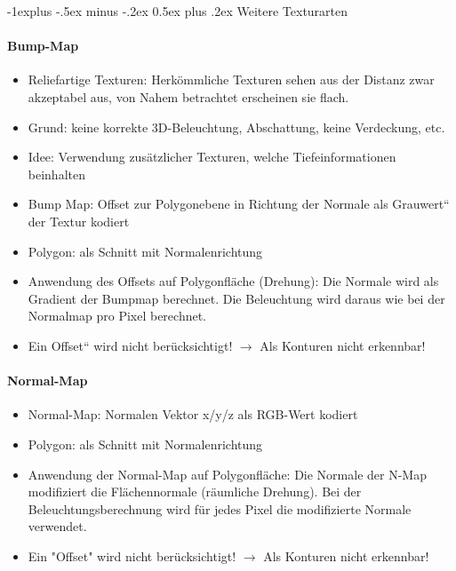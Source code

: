 \documentclass[10pt,landscape]{article}
\makeatletter
\renewcommand{\subsection}{\@startsection{subsection}{2}{0mm}%
                                {-1explus -.5ex minus -.2ex}%
                                {0.5ex plus .2ex}%
                                {\normalfont\normalsize\bfseries}}
\makeatother
\begin{document}
\begin{multicols}{3}
\subsection{ Weitere Texturarten}
\paragraph{Bump-Map}
\begin{itemize}
  \item Reliefartige Texturen: Herkömmliche Texturen sehen aus der Distanz zwar akzeptabel aus, von Nahem betrachtet erscheinen sie flach.
  \item Grund: keine korrekte 3D-Beleuchtung, Abschattung, keine Verdeckung, etc.
  \item Idee: Verwendung zusätzlicher Texturen, welche Tiefeinformationen beinhalten
\end{itemize}
\begin{itemize}
  \item Bump Map: Offset zur Polygonebene in Richtung der Normale als Grauwert“ der Textur kodiert
  \item Polygon: als Schnitt mit Normalenrichtung
  \item Anwendung des Offsets auf Polygonfläche (Drehung): Die Normale wird als Gradient der Bumpmap berechnet. Die Beleuchtung wird daraus wie bei der Normalmap pro Pixel berechnet.
  \item Ein Offset“ wird nicht berücksichtigt! $\rightarrow$ Als Konturen nicht erkennbar!
\end{itemize}


\paragraph{Normal-Map}
\begin{itemize}
  \item Normal-Map: Normalen Vektor x/y/z als RGB-Wert kodiert
  \item Polygon: als Schnitt mit Normalenrichtung
  \item Anwendung der Normal-Map auf Polygonfläche: Die Normale der N-Map modifiziert die Flächennormale (räumliche Drehung). Bei der Beleuchtungsberechnung wird für jedes Pixel die modifizierte Normale verwendet.
  \item Ein "Offset" wird nicht berücksichtigt! $\rightarrow$ Als Konturen nicht erkennbar!
\end{itemize}


\end{multicols}
\end{document}
